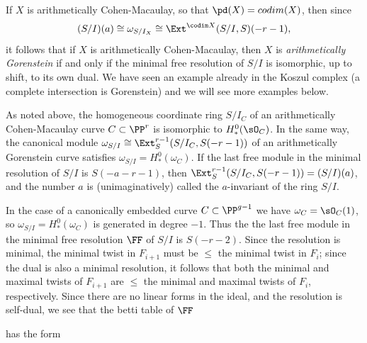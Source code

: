 If $X$ is arithmetically Cohen-Macaulay, so that
$\pd(X) = codim(X)$,  then since 
$$
(S/I)(a) \cong \omega_{S/I_X} \cong \Ext^{\codim X}(S/I, S)(-r-1),
$$
it follows that if $X$ is arithmetically Cohen-Macaulay, then $X$ is  \emph{arithmetically Gorenstein} if and only if
the  minimal free resolution of $S/I$ is isomorphic, up to shift, to its own dual. We have seen an example already
in the Koszul complex (a complete intersection is Gorenstein) and we will see more examples
below.


As noted above, the homogeneous coordinate ring $S/I_C$ of an arithmetically Cohen-Macaulay curve $C\subset \PP^r$ is isomorphic
 to $H^0_*(\sO_C)$. In the same way, the canonical module $\omega_{S/I} \cong \Ext_S^{r-1}(S/I_C, S(-r-1))$ of an arithmetically Gorenstein curve satisfies
 $\omega_{S/I} = H^0_*(\omega_C)$.  If the last free module in the minimal resolution of $S/I$ is $S(-a-r-1)$,
 then $\Ext_S^{r-1}(S/I_C, S(-r-1)) = (S/I)(a)$, and the number $a$ is (unimaginatively) called the $a$-invariant
 of the ring $S/I$.
 
 In the case of a canonically embedded curve $C\subset \PP^{g-1}$ we have $\omega_C = \sO_C(1)$, 
 so  $\omega_{S/I}= H^0_*(\omega_C)$ is generated in degree $-1$. Thus the  the last
 free module in the minimal free resolution $\FF$ of $S/I$ is $S(-r-2)$. Since the resolution is minimal,
 the minimal  twist in $F_{i+1}$ must be $\leq$ the minimal twist in $F_i$; since the dual is also a minimal resolution,
 it follows that both the minimal and maximal twists of $F_{i+1}$ are $\leq$ the minimal and maximal twists of $F_i$, respectively.
 Since there are no linear forms in the ideal, and the resolution is self-dual, we see that the betti table of $\FF$ 
 
 
 has the form

%


